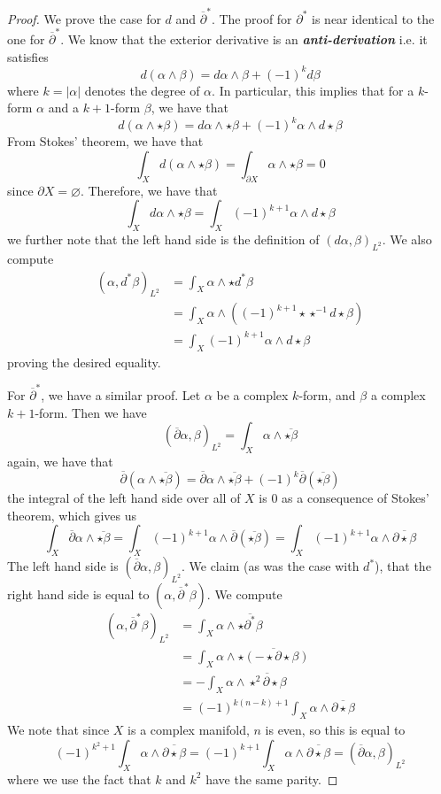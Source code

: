 \documentclass[psamsfonts, 12pt]{amsart}
\theoremstyle{definition}
\theoremstyle{remark}
\renewcommand{\emptyset}{\varnothing}
\newcommand{\ib}[1]{\textbf{\textit{#1}}}
\newcommand{\dbar}{\overline{\partial}}
\newcommand{\inv}{^{-1}}
\begin{document}
\begin{proof}
We prove the case for $d$ and $\dbar^*$. The proof for $\partial^*$ is near identical
to the one for $\dbar^*$. We know that the exterior derivative is an \ib{anti-derivation}
i.e. it satisfies
\[
d(\alpha \wedge \beta) = d\alpha \wedge \beta + (-1)^{k}d\beta
\]
where $k = |\alpha|$ denotes the degree of $\alpha$. In particular, this implies that
for a $k$-form $\alpha$ and a $k+1$-form $\beta$, we have that
\[
d(\alpha\wedge\star\beta) = d\alpha\wedge\star\beta + (-1)^k\alpha\wedge d\star\beta
\]
From Stokes' theorem, we have that
\[
\int_X d(\alpha\wedge\star\beta) = \int_{\partial X} \alpha\wedge\star\beta = 0
\]
since $\partial X = \emptyset$. Therefore, we have that
\[
\int_X d\alpha\wedge\star\beta = \int_X (-1)^{k+1}\alpha\wedge d\star\beta
\]
we further note that the left hand side is the definition of $(d\alpha,\beta)_{L^2}$.
We also compute
\begin{align*}
(\alpha,d^*\beta)_{L^2} &= \int_X \alpha\wedge\star d^*\beta \\
&= \int_X \alpha\wedge((-1)^{k+1}\star\star\inv d\star\beta) \\
&= \int_X (-1)^{k+1}\alpha\wedge d\star\beta
\end{align*}
proving the desired equality.

For $\dbar^*$, we have a similar proof. Let $\alpha$ be a complex $k$-form, and
$\beta$ a complex $k+1$-form. Then we have
\[
(\dbar\alpha,\beta)_{L^2} = \int_X\alpha\wedge\overline{\star\beta}
\]
again, we have that
\[
\dbar(\alpha\wedge\overline{\star\beta}) = \dbar\alpha\wedge\overline{\star\beta}
+ (-1)^k\dbar(\overline{\star\beta})
\]
the integral of the left hand side over all of $X$ is $0$ as a consequence of Stokes'
theorem, which gives us
\[
\int_X \dbar\alpha\wedge\overline{\star\beta} =
\int_X(-1)^{k+1}\alpha\wedge\dbar(\overline{\star\beta}) =
\int_X(-1)^{k+1}\alpha\wedge\overline{\partial\star\beta}
\]
The left hand side is $(\dbar\alpha,\beta)_{L^2}$. We claim (as was the case with $d^*$),
that the right hand side is equal to $(\alpha,\dbar^*\beta)$. We compute
\begin{align*}
(\alpha,\dbar^*\beta)_{L^2} &= \int_X \alpha \wedge \overline{\star\partial^*\beta} \\
&= \int_X\alpha \wedge \overline{\star(-\star\partial\star\beta)} \\
&= -\int_X\alpha\wedge\overline{\star^2\partial\star\beta} \\
&= (-1)^{k(n-k)+1}\int_X\alpha\wedge\overline{\partial\star\beta}
\end{align*}
We note that since $X$ is a complex manifold, $n$ is even, so this is equal to
\[
(-1)^{k^2+1}\int_X\alpha\wedge\overline{\partial\star\beta}
= (-1)^{k+1}\int_X\alpha\wedge\overline{\partial\star\beta} = (\dbar\alpha,\beta)_{L^2}
\]
where we use the fact that $k$ and $k^2$ have the same parity.
\end{proof}
%
\end{document}

